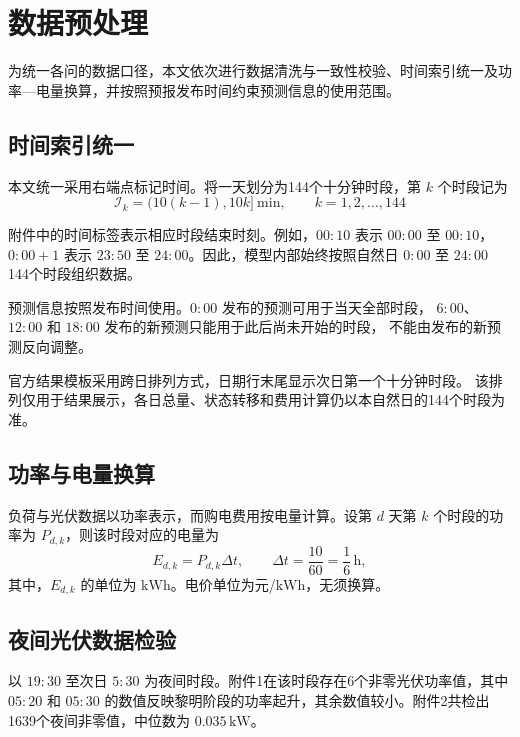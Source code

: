 \vspace{1.5em}
\section{数据预处理}
为统一各问的数据口径，本文依次进行数据清洗与一致性校验、时间索引统一及功率—电量换算，并按照预报发布时间约束预测信息的使用范围。

\subsection{时间索引统一}

本文统一采用右端点标记时间。将一天划分为144个十分钟时段，第 \(k\) 个时段记为
\begin{equation}
    \mathcal{I}_k=\bigl(10(k-1),10k\bigr]\ \mathrm{min},
    \qquad k=1,2,\ldots,144
    \label{eq:period}
\end{equation}

附件中的时间标签表示相应时段结束时刻。例如，\(00{:}10\) 表示
\(00{:}00\) 至 \(00{:}10\)，\(0{:}00{+}1\) 表示
\(23{:}50\) 至 \(24{:}00\)。因此，模型内部始终按照自然日
\(0{:}00\) 至 \(24{:}00\) 144个时段组织数据。

预测信息按照发布时间使用。\(0{:}00\) 发布的预测可用于当天全部时段，
\(6{:}00\)、\(12{:}00\) 和 \(18{:}00\) 发布的新预测只能用于此后尚未开始的时段，
不能由发布的新预测反向调整。

官方结果模板采用跨日排列方式，日期行末尾显示次日第一个十分钟时段。
该排列仅用于结果展示，各日总量、状态转移和费用计算仍以本自然日的144个时段为准。
\subsection{功率与电量换算}

负荷与光伏数据以功率表示，而购电费用按电量计算。设第 \(d\) 天第 \(k\) 个时段的功率为 \(P_{d,k}\)，则该时段对应的电量为
\begin{equation}
    E_{d,k}=P_{d,k}\Delta t,
    \qquad
    \Delta t=\frac{10}{60}=\frac{1}{6}\,\mathrm{h},
    \label{eq:energy}
\end{equation}
其中，\(E_{d,k}\) 的单位为 \(\mathrm{kWh}\)。电价单位为元/\(\mathrm{kWh}\)，无须换算。\subsection{夜间光伏数据检验}

以 \(19{:}30\) 至次日 \(5{:}30\) 为夜间时段。附件1在该时段存在6个非零光伏功率值，其中 \(05{:}20\) 和 \(05{:}30\) 的数值反映黎明阶段的功率起升，其余数值较小。附件2共检出1639个夜间非零值，中位数为 \(0.035\,\mathrm{kW}\)。

